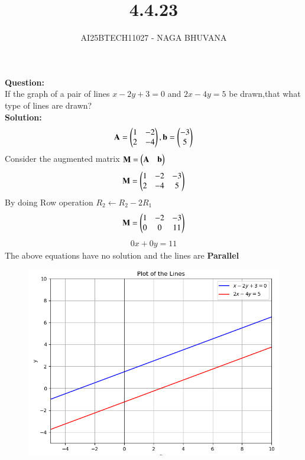 \documentclass[journal,12pt,onecolumn]{IEEEtran}
\begin{document}
\title{4.4.23}
\author{AI25BTECH11027 - NAGA BHUVANA}
{\let\newpage\relax\maketitle}
\noindent
		\textbf{Question:}\\
If the graph of a pair of lines $x-2y+3=0$ and $2x-4y=5$ be drawn,that what type of lines are drawn?\\
\textbf{Solution:}\\
\begin{align}
    \mathbf{A}=\begin{pmatrix}1&-2\\2&-4\end{pmatrix} , \mathbf{b}=\begin{pmatrix}-3\\5\end{pmatrix}
\end{align}
Consider the augmented matrix $\mathbf{M}=\begin{pmatrix}\mathbf{A} & \mathbf{b}\end{pmatrix}$
        \begin{align}
            \mathbf{M}=\begin{pmatrix}1&-2 & -3\\2 &-4 & 5\end{pmatrix}
        \end{align}
        By doing Row operation $R_2 \longleftarrow R_2-2R_1$
        \begin{align}
            \mathbf{M}=\begin{pmatrix}1&-2&-3\\0&0&11\end{pmatrix}
        \end{align}
        \begin{align}
            0x+0y=11
        \end{align}
        The above equations have no solution and the lines are \textbf{Parallel}\\
	\begin{figure}[H]
	\centering
	\includegraphics[width=0.7\linewidth]{figs/fig1.png}
	\caption{}
	\label{fig}
	\end{figure}
\end{document}
